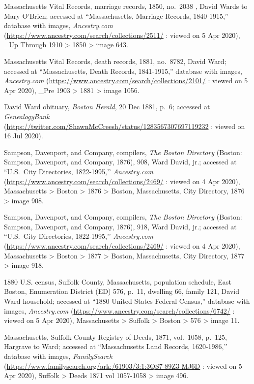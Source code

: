 \begin{thebibliography}{999}
	Massachusetts Vital Records, marriage records, 1850, no.\ 2038 , David Wards to Mary O'Brien; accessed at ``Massachusetts, Marriage Records, 1840-1915,'' database with images, \textit{Ancestry.com} (\url{https://www.ancestry.com/search/collections/2511/} : viewed on 5 Apr 2020), \_Up Through 1910 > 1850 > image 643.
	
	Massachusetts Vital Records, death records, 1881, no.\ 8782, David Ward; accessed at ``Massachusetts, Death Records, 1841-1915,'' database with images, \textit{Ancestry.com} (\url{https://www.ancestry.com/search/collections/2101/} : viewed on 5 Apr 2020), \_Pre 1903 > 1881 > image 1056.
	
	David Ward obituary, \textit{Boston Herald}, 20 Dec 1881, p.\ 6; accessed at \textit{GenealogyBank} (\url{https://twitter.com/ShawnMcCreesh/status/1283567307697119232} : viewed on 16 Jul 2020).
	
	
	Sampson, Davenport, and Company, compilers, \textit{The Boston Directory} (Boston: Sampson, Davenport, and Company, 1876), 908, Ward David, jr.; accessed at ``U.S.\ City Directories, 1822-1995,’’ \textit{Ancestry.com} (\url{https://www.ancestry.com/search/collections/2469/} : viewed on 4 Apr 2020), Massachusetts > Boston > 1876 > Boston, Massachusetts, City Directory, 1876 > image 908.
	
	Sampson, Davenport, and Company, compilers, \textit{The Boston Directory} (Boston: Sampson, Davenport, and Company, 1876), 918, Ward David, jr.; accessed at ``U.S.\ City Directories, 1822-1995,’’ \textit{Ancestry.com} (\url{https://www.ancestry.com/search/collections/2469/} : viewed on 4 Apr 2020), Massachusetts > Boston > 1877 > Boston, Massachusetts, City Directory, 1877 > image 918.
	
	1880 U.S. census, Suffolk County, Massachusetts, population schedule, East Boston, Enumeration District (ED) 576, p.\ 11, dwelling 66, family 121, David Ward household; accessed at ``1880 United States Federal Census,'' database with images, \textit{Ancestry.com} (\url{https://www.ancestry.com/search/collections/6742/} : viewed on 5 Apr 2020), Massachusetts > Suffolk > Boston > 576 > image 11.
	
	Massachusetts, Suffolk County Registry of Deeds, 1871, vol.\ 1058, p.\ 125, Hargrave to Ward; accessed at ``Massachusetts Land Records, 1620-1986,’’ database with images, \textit{FamilySearch} (\url{https://www.familysearch.org/ark:/61903/3:1:3QS7-89Z3-MJ6D} : viewed on 5 Apr 2020), Suffolk > Deeds 1871 vol 1057-1058 > image 496.
	

\end{thebibliography}
